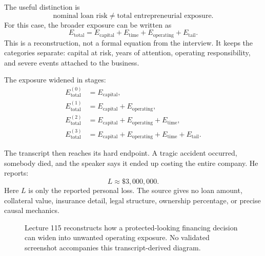 \documentclass[11pt,oneside]{book}
\begin{document}
The useful distinction is
\[
\text{nominal loan risk}
\neq
\text{total entrepreneurial exposure}.
\]
For this case, the broader exposure can be written as
\[
E_{\mathrm{total}}
=
E_{\mathrm{capital}}
+
E_{\mathrm{time}}
+
E_{\mathrm{operating}}
+
E_{\mathrm{tail}}.
\]
This is a reconstruction, not a formal equation from the interview. It keeps the categories separate: capital at risk, years of attention, operating responsibility, and severe events attached to the business.

The exposure widened in stages:
\begin{align}
E_{\mathrm{total}}^{(0)}
&=
E_{\mathrm{capital}},
\\
E_{\mathrm{total}}^{(1)}
&=
E_{\mathrm{capital}}
+
E_{\mathrm{operating}},
\\
E_{\mathrm{total}}^{(2)}
&=
E_{\mathrm{capital}}
+
E_{\mathrm{operating}}
+
E_{\mathrm{time}},
\\
E_{\mathrm{total}}^{(3)}
&=
E_{\mathrm{capital}}
+
E_{\mathrm{operating}}
+
E_{\mathrm{time}}
+
E_{\mathrm{tail}}.
\end{align}

The transcript then reaches its hard endpoint. A tragic accident occurred, somebody died, and the speaker says it ended up costing the entire company. He reports:
\[
L\approx \text{\$}3{,}000{,}000.
\]
Here \(L\) is only the reported personal loss. The source gives no loan amount, collateral value, insurance detail, legal structure, ownership percentage, or precise causal mechanics.

\begin{figure}
\centering
{}
\caption{Lecture 115 reconstructs how a protected-looking financing decision can widen into unwanted operating exposure. No validated screenshot accompanies this transcript-derived diagram.}
\end{figure}
\end{document}
